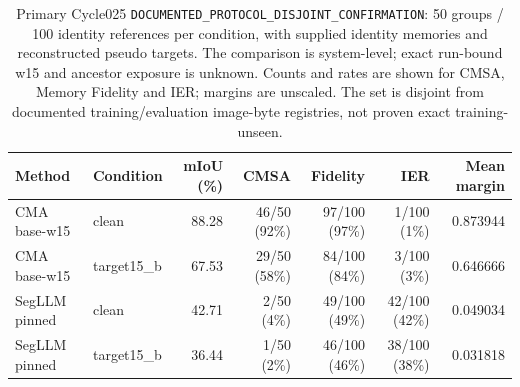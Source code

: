 \begin{table}[t]
\centering
\small
\setlength{\tabcolsep}{4pt}
\caption{Primary Cycle025 \texttt{DOCUMENTED\_PROTOCOL\_DISJOINT\_CONFIRMATION}:
50 groups / 100 identity references per condition, with supplied identity memories
and reconstructed pseudo targets. The comparison is system-level; exact run-bound
w15 and ancestor exposure is unknown. Counts and rates are shown for CMSA,
Memory Fidelity and IER; margins are unscaled. The set is disjoint from documented
training/evaluation image-byte registries, not proven exact training-unseen.}
\label{tab:primary-memory}
\begin{tabular}{llrrrrr}
\toprule
Method & Condition & mIoU (\%) & CMSA & Fidelity & IER & Mean margin \\
\midrule
CMA base-w15 & clean & 88.28 & 46/50 (92\%) & 97/100 (97\%) & 1/100 (1\%) & 0.873944 \\
CMA base-w15 & target15\_b & 67.53 & 29/50 (58\%) & 84/100 (84\%) & 3/100 (3\%) & 0.646666 \\
SegLLM pinned & clean & 42.71 & 2/50 (4\%) & 49/100 (49\%) & 42/100 (42\%) & 0.049034 \\
SegLLM pinned & target15\_b & 36.44 & 1/50 (2\%) & 46/100 (46\%) & 38/100 (38\%) & 0.031818 \\
\bottomrule
\end{tabular}
\end{table}
